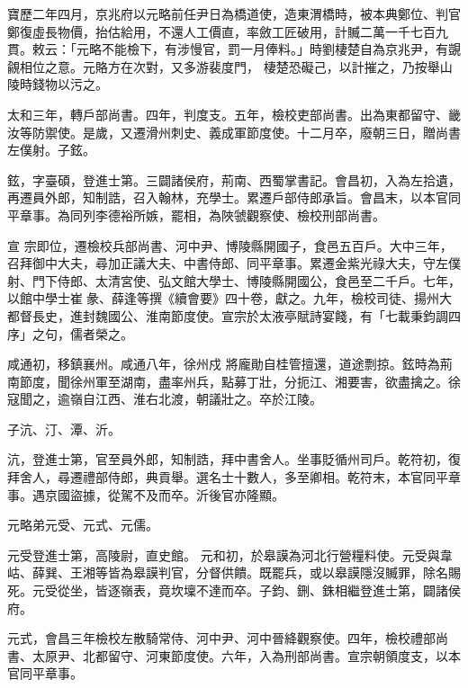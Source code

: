 \begin{pinyinscope}
 寶歷二年四月，京兆府以元略前任尹日為橋道使，造東渭橋時，被本典鄭位、判官鄭復虛長物價，抬估給用，不還人工價直，率斂工匠破用，計贓二萬一千七百九貫。敕云：「元略不能檢下，有涉慢官，罰一月俸料。」時劉棲楚自為京兆尹，有覬覦相位之意。元賂方在次對，又多游裴度門，
 棲楚恐礙己，以計摧之，乃按舉山陵時錢物以污之。



 太和三年，轉戶部尚書。四年，判度支。五年，檢校吏部尚書。出為東都留守、畿汝等防禦使。是歲，又遷滑州刺史、義成軍節度使。十二月卒，廢朝三日，贈尚書左僕射。子鉉。



 鉉，字臺碩，登進士第。三闢諸侯府，荊南、西蜀掌書記。會昌初，入為左拾遺，再遷員外郎，知制誥，召入翰林，充學士。累遷戶部侍郎承旨。會昌末，以本官同平章事。為同列李德裕所嫉，罷相，為陜虢觀察使、檢校刑部尚書。



 宣
 宗即位，遷檢校兵部尚書、河中尹、博陵縣開國子，食邑五百戶。大中三年，召拜御中大夫，尋加正議大夫、中書侍郎、同平章事。累遷金紫光祿大夫，守左僕射、門下侍郎、太清宮使、弘文館大學士、博陵縣開國公，食邑至二千戶。七年，以館中學士崔彖、薛逢等撰《續會要》四十卷，獻之。九年，檢校司徒、揚州大都督長史，進封魏國公、淮南節度使。宣宗於太液亭賦詩宴餞，有「七載秉鈞調四序」之句，儒者榮之。



 咸通初，移鎮襄州。咸通八年，徐州戍
 將龐勛自桂管擅還，道途剽掠。鉉時為荊南節度，聞徐州軍至湖南，盡率州兵，點募丁壯，分扼江、湘要害，欲盡擒之。徐寇聞之，逾嶺自江西、淮右北渡，朝議壯之。卒於江陵。



 子沆、汀、潭、沂。



 沆，登進士第，官至員外郎，知制誥，拜中書舍人。坐事貶循州司戶。乾符初，復拜舍人，尋遷禮部侍郎，典貢舉。選名士十數人，多至卿相。乾符末，本官同平章事。遇京國盜據，從駕不及而卒。沂後官亦隆顯。



 元略弟元受、元式、元儒。



 元受登進士第，高陵尉，直史館。
 元和初，於皋謨為河北行營糧料使。元受與韋岵、薛巽、王湘等皆為皋謨判官，分督供饋。既罷兵，或以皋謨隱沒贓罪，除名賜死。元受從坐，皆逐嶺表，竟坎壈不達而卒。子鈞、鉶、銖相繼登進士第，闢諸侯府。



 元式，會昌三年檢校左散騎常侍、河中尹、河中晉絳觀察使。四年，檢校禮部尚書、太原尹、北都留守、河東節度使。六年，入為刑部尚書。宣宗朝領度支，以本官同平章事。




\end{pinyinscope}
